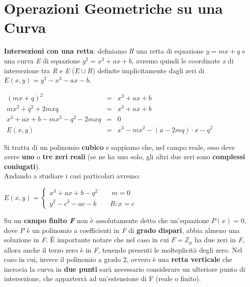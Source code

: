 \section{Operazioni Geometriche su una Curva}
\textbf{Intersezioni con una retta}: definiamo \textit{R} una retta di equazione $y = mx + q$ e una curva \textit{E} di equazione $y^2 = x^3 + ax + b$, avremo quindi le coordinate \textit{x} di intersezione tra \textit{R} e \textit{E} ($E \cup R$) definite implicitamente dagli zeri di $E(x, y) = y^2 - x^3 - ax - b$.
\begin{center}
    \begin{math}
        \begin{aligned}
            (mx + q) ^ 2 &=& x^3 + ax + b \\
            mx^2 + q^2 + 2mxq &=& x^3 + ax + b \\
            x^3 + ax + b - mx^2 - q^2 - 2mxq &=& 0 \\
            E(x, y) &=& x^3 - mx^2 - (a - 2mq) \cdot x - q^2
        \end{aligned}
    \end{math}
\end{center}
Si tratta di un polinomio \textbf{cubico} e sappiamo che, nel campo reale, esso deve avere \textbf{uno} o \textbf{tre zeri reali} (se ne ha uno solo, gli altri due zeri sono \textbf{complessi coniugati}). \\
Andando a studiare i casi particolari avremo:
\begin{center}
    \begin{math}
        E(x, y) =
        \begin{cases}
            x^3 + ax + b - q^2 \qquad m = 0 \\
            y^2 - c^3 - ac - b \qquad R: x = c 
        \end{cases}
    \end{math}
\end{center}
Su un \textbf{campo finito \textit{F}} non è assolutamente detto che un'equazione $P(x) = 0$, dove \textit{P} è un polinomio a coefficienti in \textit{F} di \textbf{grado dispari}, abbia almeno una soluzione in \textit{F}. È importante notare che nel caso in cui $F = \mathbb{Z}_p$ ha due zeri in \textit{F}, allora anche il terzo zero è in \textit{F}, tenendo presenti le molteplicità degli zero. Nel caso in cui, invece il polinomio a grado 2, ovvero è una \textbf{retta verticale} che incrocia la curva in \textbf{due punti} sarà necessario considerare un ulteriore punto di intersezione, che apparterrà ad un'estensione di F (reale o finito).

